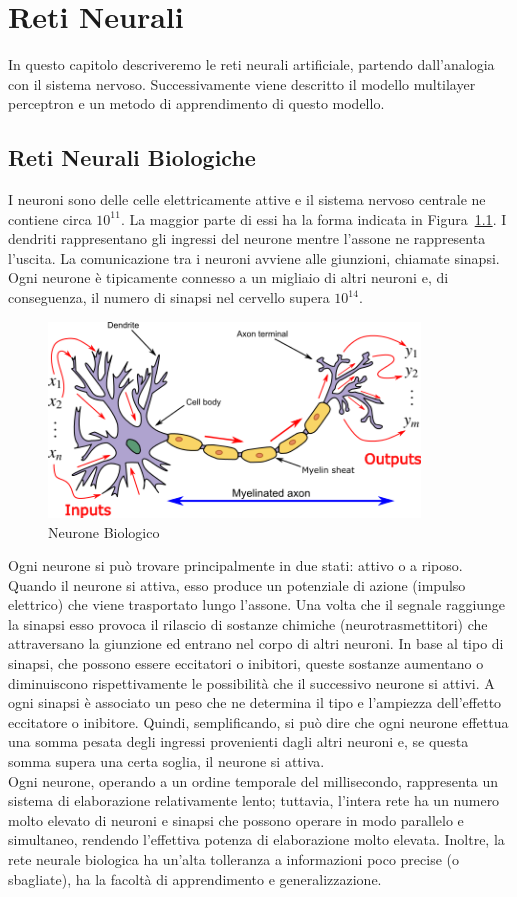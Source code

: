 \documentclass[11pt,a4paper,twoside,
openright]{book}
\begin{document}
\chapter{Reti Neurali}
In questo capitolo descriveremo le reti neurali artificiale, partendo dall'analogia con il sistema nervoso. Successivamente viene descritto il modello multilayer perceptron e un metodo di apprendimento di questo modello.
\section{Reti Neurali Biologiche}
I neuroni sono delle celle elettricamente attive e il sistema nervoso centrale ne contiene circa $10^{11}$. La maggior parte di essi ha la forma indicata in Figura~\ref{fig:neurbio}. I dendriti rappresentano gli ingressi del neurone mentre l’assone ne rappresenta l’uscita. La comunicazione tra i neuroni avviene alle giunzioni, chiamate sinapsi. Ogni neurone è tipicamente connesso a un migliaio di altri neuroni e, di conseguenza, il numero di sinapsi nel cervello supera $10^{14}$.
\begin{figure}[h!]
\begin{center}
\includegraphics[width=280pt]{BioNeuron.png}
\caption{Neurone Biologico~\cite{pict_neur}}
\end{center}
\label{fig:neurbio}
\end{figure}

Ogni neurone si può trovare principalmente in due stati: attivo o a riposo. Quando il neurone si attiva, esso produce un potenziale di azione (impulso elettrico) che viene trasportato lungo l’assone. Una volta che il segnale raggiunge la sinapsi esso provoca il rilascio di sostanze chimiche (neurotrasmettitori) che attraversano la giunzione ed entrano nel corpo di altri neuroni. In base al tipo di sinapsi, che possono essere eccitatori o inibitori, queste sostanze aumentano o diminuiscono rispettivamente le possibilità che il successivo neurone si attivi. A ogni sinapsi è associato un peso che ne determina il tipo e l’ampiezza dell’effetto eccitatore o inibitore. Quindi, semplificando, si può dire che ogni neurone effettua una somma pesata degli ingressi provenienti dagli altri neuroni e, se questa somma supera una certa soglia, il neurone si attiva.\\
Ogni neurone, operando a un ordine temporale del millisecondo, rappresenta un sistema di elaborazione relativamente lento; tuttavia, l’intera rete ha un numero molto elevato di neuroni e sinapsi che possono operare in modo parallelo e simultaneo, rendendo l’effettiva potenza di elaborazione molto elevata. Inoltre, la rete neurale biologica ha un’alta tolleranza a informazioni poco precise (o sbagliate), ha la facoltà di apprendimento e generalizzazione.
\end{document}
